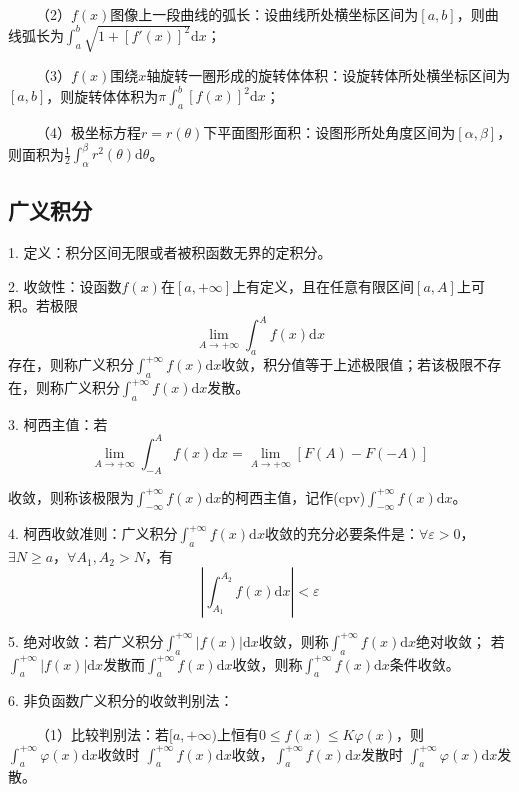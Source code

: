 ~~~~（2）$f(x)$图像上一段曲线的弧长：设曲线所处横坐标区间为$[a,b]$，则曲线弧长为$\int_a^b \sqrt{1+\left[f'(x)\right]^2}\mathrm{d}x$；

~~~~（3）$f(x)$围绕$x$轴旋转一圈形成的旋转体体积：设旋转体所处横坐标区间为$[a,b]$，则旋转体体积为$\pi \int_a^b \left[f(x)\right]^2\mathrm{d}x$；

~~~~（4）极坐标方程$r=r(\theta)$下平面图形面积：设图形所处角度区间为$[\alpha,\beta]$，则面积为$\frac{1}{2}\int_\alpha^\beta r^2(\theta)\mathrm{d}\theta$。

\subsection{广义积分}

1. 定义：积分区间无限或者被积函数无界的定积分。

2. 收敛性：设函数$f(x)$在$[a,+\infty]$上有定义，且在任意有限区间$[a,A]$上可积。若极限
\begin{equation*}
    \lim\limits_{A\rightarrow +\infty}\int_a^A f(x)\mathrm{d}x
\end{equation*}
存在，则称广义积分$\int_a^{+\infty}f(x)\mathrm{d}x$收敛，积分值等于上述极限值；若该极限不存在，则称广义积分$\int_a^{+\infty}f(x)\mathrm{d}x$发散。

3. 柯西主值：若
\begin{equation*}
    \lim\limits_{A\rightarrow +\infty}\int_{-A}^A f(x)\mathrm{d}x=\lim\limits_{A\rightarrow+\infty} \left[F(A)-F(-A)\right]
\end{equation*}

收敛，则称该极限为$\int_{-\infty}^{+\infty}f(x)\mathrm{d}x$的柯西主值，记作(cpv)$\int_{-\infty}^{+\infty}f(x)\mathrm{d}x$。

4. 柯西收敛准则：广义积分$\int_a^{+\infty}f(x)\mathrm{d}x$收敛的充分必要条件是：$\forall \varepsilon>0$，$\exists N \geqslant a$，$\forall A_1,A_2>N$，有
\begin{equation*}
    \left|\int_{A_1}^{A_2}f(x)\mathrm{d}x\right|<\varepsilon
\end{equation*}

5. 绝对收敛：若广义积分$\int_a^{+\infty}\left|f(x)\right|\mathrm{d}x$收敛，则称$\int_a^{+\infty}f(x)\mathrm{d}x$绝对收敛；
若$\int_a^{+\infty}\left|f(x)\right|\mathrm{d}x$发散而$\int_a^{+\infty}f(x)\mathrm{d}x$收敛，则称$\int_a^{+\infty}f(x)\mathrm{d}x$条件收敛。

6. 非负函数广义积分的收敛判别法：

~~~~（1）比较判别法：若$[a,+\infty)$上恒有$0\leqslant f(x)\leqslant K\varphi(x)$，则$\int_a^{+\infty}\varphi(x)\mathrm{d}x$收敛时 $\int_a^{+\infty}f(x)\mathrm{d}x$收敛，$\int_a^{+\infty}f(x)\mathrm{d}x$发散时
$\int_a^{+\infty}\varphi(x)\mathrm{d}x$发散。

